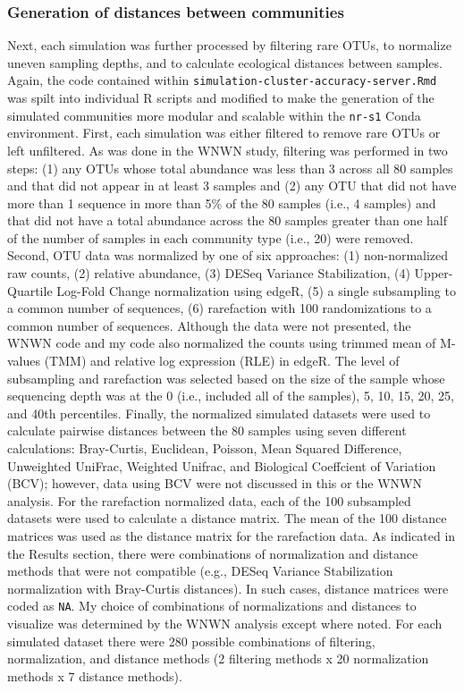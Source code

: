\documentclass[
]{article}
\begin{document}
\hypertarget{generation-of-distances-between-communities}{%
\subsubsection{Generation of distances between
communities}\label{generation-of-distances-between-communities}}

Next, each simulation was further processed by filtering rare OTUs, to
normalize uneven sampling depths, and to calculate ecological distances
between samples. Again, the code contained within
\texttt{simulation-cluster-accuracy-server.Rmd} was spilt into
individual R scripts and modified to make the generation of the
simulated communities more modular and scalable within the
\texttt{nr-s1} Conda environment. First, each simulation was either
filtered to remove rare OTUs or left unfiltered. As was done in the WNWN
study, filtering was performed in two steps: (1) any OTUs whose total
abundance was less than 3 across all 80 samples and that did not appear
in at least 3 samples and (2) any OTU that did not have more than 1
sequence in more than 5\% of the 80 samples (i.e., 4 samples) and that
did not have a total abundance across the 80 samples greater than one
half of the number of samples in each community type (i.e., 20) were
removed. Second, OTU data was normalized by one of six approaches: (1)
non-normalized raw counts, (2) relative abundance, (3) DESeq Variance
Stabilization, (4) Upper-Quartile Log-Fold Change normalization using
edgeR, (5) a single subsampling to a common number of sequences, (6)
rarefaction with 100 randomizations to a common number of sequences.
Although the data were not presented, the WNWN code and my code also
normalized the counts using trimmed mean of M-values (TMM) and relative
log expression (RLE) in edgeR. The level of subsampling and rarefaction
was selected based on the size of the sample whose sequencing depth was
at the 0 (i.e., included all of the samples), 5, 10, 15, 20, 25, and
40th percentiles. Finally, the normalized simulated datasets were used
to calculate pairwise distances between the 80 samples using seven
different calculations: Bray-Curtis, Euclidean, Poisson, Mean Squared
Difference, Unweighted UniFrac, Weighted Unifrac, and Biological
Coeffcient of Variation (BCV); however, data using BCV were not
discussed in this or the WNWN analysis. For the rarefaction normalized
data, each of the 100 subsampled datasets were used to calculate a
distance matrix. The mean of the 100 distance matrices was used as the
distance matrix for the rarefaction data. As indicated in the Results
section, there were combinations of normalization and distance methods
that were not compatible (e.g., DESeq Variance Stabilization
normalization with Bray-Curtis distances). In such cases, distance
matrices were coded as \texttt{NA}. My choice of combinations of
normalizations and distances to visualize was determined by the WNWN
analysis except where noted. For each simulated dataset there were 280
possible combinations of filtering, normalization, and distance methods
(2 filtering methods x 20 normalization methods x 7 distance methods).
\end{document}
